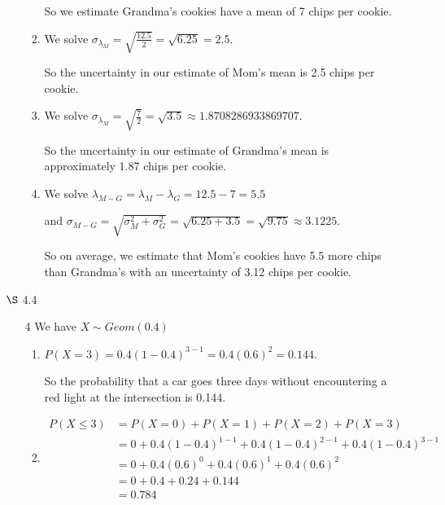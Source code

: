 \documentclass[12pt,letterpaper]{article}
\begin{document}
\begin{enumerate}
\begin{enumerate}
\begin{enumerate}[label=(\arabic*)]
              So we estimate Grandma's cookies have a mean of 7 chips per cookie.
            \item
              We solve $\sigma_{\lambda_M} = \sqrt{\frac{12.5}{2}} = \sqrt{6.25} = 2.5$.

              So the uncertainty in our estimate of Mom's mean is 2.5 chips per cookie.
            \item
              We solve $\sigma_{\lambda_M} = \sqrt{\frac{7}{2}} = \sqrt{3.5} \approx 1.8708286933869707$.

              So the uncertainty in our estimate of Grandma's mean is approximately 1.87 chips per cookie.
            \item
              We solve $\lambda_{M - G} = \lambda_M - \lambda_G = 12.5 - 7 = 5.5$

              and $\sigma_{M - G} = \sqrt{\sigma_M^2 + \sigma_G^2} = \sqrt{6.25 + 3.5} = \sqrt{9.75} \approx 3.1225$.

              So on average,
              we estimate that Mom's cookies have 5.5 more chips than Grandma's
              with an uncertainty of 3.12 chips per cookie.
          \end{enumerate}
      \end{enumerate}
    \item [$\S$ 4.4]
      \begin{enumerate}
        \item [4]
          We have $X \sim Geom(0.4)$
          \begin{enumerate}[label=(\arabic*)]
            \item
              $P(X = 3) = 0.4(1 - 0.4)^{3 - 1} = 0.4(0.6)^2 = 0.144$.

              So the probability that a car goes three days without encountering a red light at the intersection is 0.144.
            \item
              \begin{align*}
                P(X \le 3) &= P(X = 0) + P(X = 1) + P(X = 2) + P(X = 3) \\
                &= 0 + 0.4(1 - 0.4)^{1 - 1} + 0.4(1 - 0.4)^{2 - 1} + 0.4(1 - 0.4)^{3 - 1} \\
                &= 0 + 0.4(0.6)^0+ 0.4(0.6)^1 + 0.4(0.6)^2 \\
                &= 0 + 0.4 + 0.24 + 0.144 \\
                &= 0.784
              \end{align*}


\end{enumerate}
\end{enumerate}
\end{enumerate}
\end{document}
